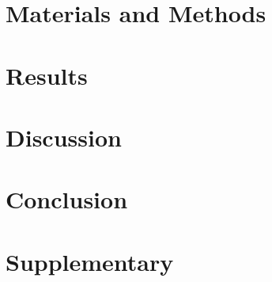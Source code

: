\documentclass[10pt]{article}
\begin{document}
	\section{Materials and Methods}
	
	\label{section:Chap_Material_and_Methods}
	\newpage
	
	\section{Results}
	
	\label{section:Chap_Results}
	\newpage
	
	\section{Discussion}
	
	\label{section:Chap_Discussion}
	\newpage
	
	\section{Conclusion}
	
	\label{section:Chap_Conclusion}
	\newpage
	
%	
	
	\section*{Supplementary}
	
	\label{section:Chap_Supplementary}
	\newpage
	

	
	
\end{document}
